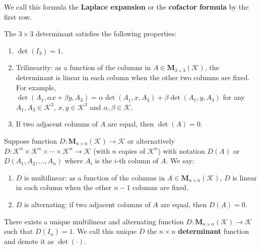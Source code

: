 \documentclass{ctexart}
\newcommand{\M}{\mathbf{M}}
\begin{document}
    \begin{myrmk}
        We call this formula the \textbf{Laplace expansion} or the \textbf{cofactor formula} by the first row.
    \end{myrmk}
    \begin{mythm}
        The $3\times 3$ determinant satisfies the following properties:
        \begin{enumerate}
            \item $\det(I_3) = 1$.
            \item Trilinearity: as a function of the columns in $A\in \M_{3 \times 3}(\mathcal{K})$, the determinant is linear in each column when the other two columns are fixed. For example, $\det(A_1, \alpha x + \beta y, A_3) = \alpha \det(A_1, x, A_3) + \beta \det(A_1, y, A_3)$ for any $A_1, A_3 \in \mathcal{K}^3$, $x,y \in \mathcal{K}^3$ and $\alpha, \beta \in \mathcal{K}$.
            \item If two adjacent columns of $A$ are equal, then $\det(A) = 0$.
        \end{enumerate}
    \end{mythm}
    \begin{mydef}
        Suppose function $D: \mathbf{M}_{n \times n}(\mathcal{K}) \to \mathcal{K}$ or alternatively $D: \mathcal{K}^n \times \mathcal{K}^n \times \cdots \times \mathcal{K}^n \to \mathcal{K}$ (with $n$ copies of $\mathcal{K}^n$) with notation $D(A)$ or $D(A_1, A_2, \ldots, A_n)$ where $A_i$ is the $i$-th column of $A$. We say:
        \begin{enumerate}
            \item $D$ is multilinear: as a function of the columns in $A\in \M_{n \times n}(\mathcal{K})$, $D$ is linear in each column when the other $n-1$ columns are fixed.
            \item $D$ is alternating: if two adjacent columns of $A$ are equal, then $D(A) = 0$.
        \end{enumerate}
    \end{mydef}
    \begin{mythm}
        There exists a unique multilinear and alternating function $D: \mathbf{M}_{n \times n}(\mathcal{K}) \to \mathcal{K}$ such that $D(I_n) = 1$. We call this unique $D$ the $n\times n$ \textbf{determinant} function and denote it as $\det(\cdot)$.
    \end{mythm}
\end{document}
